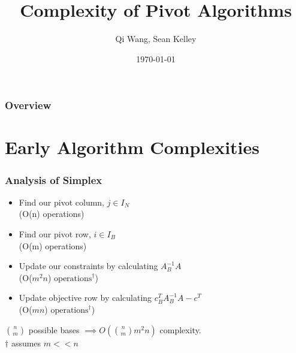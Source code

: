 \documentclass{beamer}
\title[Short title]{Complexity of Pivot Algorithms} %
\author{Qi Wang, Sean Kelley} %
\date{\today} %
\begin{document}
\begin{frame}
\titlepage %
\end{frame}

\begin{frame}
\frametitle{Overview} %
\tableofcontents %
\end{frame}


\section{Early Algorithm Complexities} %
\begin{frame}
	\frametitle{Analysis of Simplex}
	\begin{itemize}
		\item Find our pivot column, $j \in I_N$ \\
		(O(n) operations)
		\item Find our pivot row, $i \in I_B$ \\
		(O(m) operations)
		\item Update our constraints by calculating $A_B^{-1}A$ \\
		(O($m^2n$) $\text{operations}^{\dagger}$)
		\item Update objective row by calculating $c_B^T A_B^{-1} A - c^T$ \\
		(O($mn$) $\text{operations}^{\dagger}$)
	\end{itemize}
	$\binom{n}{m}$ possible bases $\implies O(\binom{n}{m} m^2n)$ complexity. \\
	$\dagger$ assumes $m << n$
\end{frame}
\end{document}
